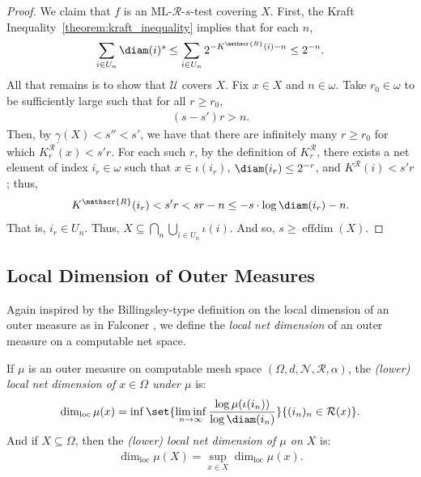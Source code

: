 \begin{proof}
    We claim that $f$ is an ML-$\mathscr{R}$-$s$-test covering $X$. First, the Kraft Inequality~\ref{theorem:kraft_inequality} implies that for each $n$,  
    \begin{align*}
        \sum_{i \in U_n} \diam(i)^s \leq \sum_{i \in U_n} 2^{-K^{\mathscr{R}}(i) - n} \leq 2^{-n}.
    \end{align*}
    All that remains is to show that $\mathcal{U}$ covers $X$. Fix $x \in X$ and $n \in \omega$. Take $r_0 \in \omega$ to be sufficiently large such that for all $r \geq r_0$, 
    \begin{align*}
        (s - s')r > n.
    \end{align*}
    Then, by $\underline{\gamma}(X) < s'' < s'$, we have that there are infinitely many $r \geq r_0$ for which $K^{\mathscr{R}}_r(x) < s' r$. For each such $r$, by the definition of $K^{\mathscr{R}}_r$, there exists a net element of index $i_r \in \omega$ such that $x \in \iota(i_r)$, $\diam(i_r) \leq 2^{-r}$, and $K^{\mathscr{R}}(i) < s' r$; thus,
    \begin{align*}
        K^{\mathscr{R}}(i_r) < s' r < sr - n \leq -s \cdot \log\diam(i_r) - n.
    \end{align*}
    That is, $i_r \in U_n$. Thus, $X \subseteq \bigcap_n \bigcup_{i \in U_n} \iota(i)$. And so, $s \geq \operatorname{effdim}(X)$.
\end{proof}

\subsection{Local Dimension of Outer Measures}

Again inspired by the Billingsley-type definition on the local dimension of an outer measure as in Falconer \cite{Fal90}, we define the \textit{local net dimension} of an outer measure on a computable net space.

\begin{definition}
    If $\mu$ is an outer measure on computable mesh space $(\Omega, d, \mathcal{N}, \mathscr{R}, \alpha)$, the \textit{(lower) local net dimension of $x \in \Omega$ under $\mu$} is:
    \begin{align*}
        \dim_{\operatorname{loc}} \mu(x) = \inf \set{\liminf_{n \to \infty} \frac{\log \mu(\iota(i_n))}{\log \diam(i_n)}}{(i_n)_n \in \mathcal{R}(x)}.
    \end{align*}
    And if $X \subseteq \Omega$, then the \textit{(lower) local net dimension of $\mu$ on $X$} is:
    \begin{align*}
        \dim_{\operatorname{loc}} \mu(X) = \sup_{x \in X} \dim_{\operatorname{loc}} \mu(x).
    \end{align*}
\end{definition}

